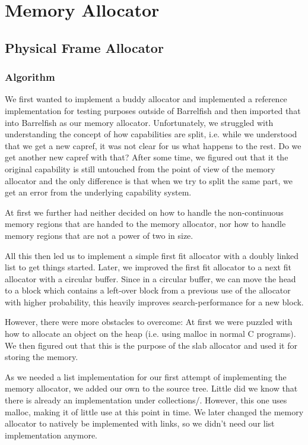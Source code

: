 \chapter{Memory Allocator}

\section{Physical Frame Allocator}

\subsection{Algorithm}

We first wanted to implement a buddy allocator and implemented a reference
implementation for testing purposes outside of Barrelfish and then imported that
into Barrelfish as our memory allocator. Unfortunately, we struggled with understanding
the concept of how capabilities are split, i.e. while we understood that we get a new capref, 
it was not clear for us what happens to the rest. Do we get another new capref
with that? After some time, we figured out that it the original capability is
still untouched from the point of view of the memory allocator and the only
difference is that when we try to split the same part, we get an error from the
underlying capability system.

At first we further had neither decided on how to handle the non-continuous memory regions that are
handed to the memory allocator, nor how to handle memory regions that are not a
power of two in size.

All this then led us to implement a simple first fit allocator with a doubly
linked list to get things started. Later, we improved the first fit allocator to a
next fit allocator with a circular buffer. Since in a circular buffer, we can
move the head to a block which contains a left-over block
from a previous use of the allocator with higher probability, this heavily improves search-performance for 
a new block.

However, there were more obstacles to overcome: At first we were puzzled with how to allocate an
object on the heap (i.e. using malloc in normal C programs). We then
figured out that this is the purpose of the slab allocator and used it for 
storing the memory.

As we needed a list implementation for our first attempt of implementing the
memory allocator, we added our own to the source tree. Little did we know that
there is already an implementation under collections/. However, this one 
uses malloc, making it of little use at this point in time.
We later changed the memory allocator to natively be implemented with links, so we
didn't need our list implementation anymore.

